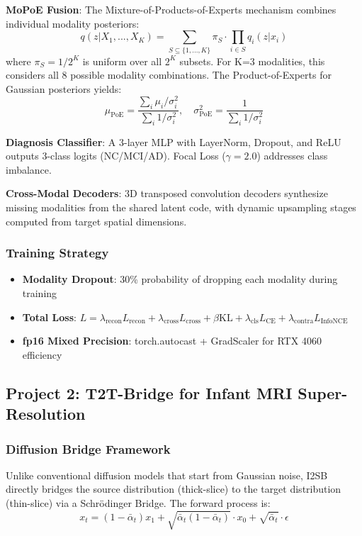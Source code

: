 \documentclass[11pt,a4paper]{article}
\begin{document}
\textbf{MoPoE Fusion}: The Mixture-of-Products-of-Experts mechanism combines individual modality posteriors:
\begin{equation}
q(z|X_1,...,X_K) = \sum_{S \subseteq \{1,...,K\}} \pi_S \cdot \prod_{i \in S} q_i(z|x_i)
\end{equation}
where $\pi_S = 1/2^K$ is uniform over all $2^K$ subsets. For K=3 modalities, this considers all 8 possible modality combinations. The Product-of-Experts for Gaussian posteriors yields:
\begin{equation}
\mu_{\text{PoE}} = \frac{\sum_i \mu_i / \sigma_i^2}{\sum_i 1/\sigma_i^2}, \quad \sigma^2_{\text{PoE}} = \frac{1}{\sum_i 1/\sigma_i^2}
\end{equation}

\textbf{Diagnosis Classifier}: A 3-layer MLP with LayerNorm, Dropout, and ReLU outputs 3-class logits (NC/MCI/AD). Focal Loss ($\gamma=2.0$) addresses class imbalance.

\textbf{Cross-Modal Decoders}: 3D transposed convolution decoders synthesize missing modalities from the shared latent code, with dynamic upsampling stages computed from target spatial dimensions.

\subsubsection{Training Strategy}
\begin{itemize}
    \item \textbf{Modality Dropout}: 30\% probability of dropping each modality during training
    \item \textbf{Total Loss}: $L = \lambda_{\text{recon}} L_{\text{recon}} + \lambda_{\text{cross}} L_{\text{cross}} + \beta \text{KL} + \lambda_{\text{cls}} L_{\text{CE}} + \lambda_{\text{contra}} L_{\text{InfoNCE}}$
    \item \textbf{fp16 Mixed Precision}: torch.autocast + GradScaler for RTX 4060 efficiency
\end{itemize}

\subsection{Project 2: T2T-Bridge for Infant MRI Super-Resolution}

\subsubsection{Diffusion Bridge Framework}
Unlike conventional diffusion models that start from Gaussian noise, I2SB directly bridges the source distribution (thick-slice) to the target distribution (thin-slice) via a Schr\"odinger Bridge. The forward process is:
\begin{equation}
x_t = (1-\bar{\alpha}_t) x_1 + \sqrt{\bar{\alpha}_t(1-\bar{\alpha}_t)} \cdot x_0 + \sqrt{\bar{\alpha}_t} \cdot \epsilon
\end{equation}
\end{document}
